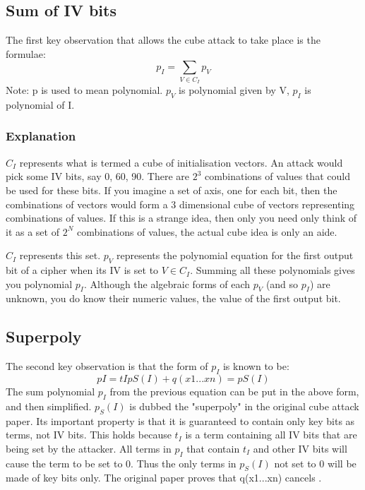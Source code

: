 \documentclass{report}
\begin{document}
\subsection{Sum of IV bits}
The first key observation that allows the cube attack to take place is the formulae:
\begin{equation} \label{eq:superpoly}
p_I = \sum\limits_{V \in C_I} p_V 
\end{equation}
Note: p is used to mean polynomial. $p_V$ is polynomial given by V, $p_I$ is polynomial of I.
\subsubsection{Explanation}
$C_I$ represents what is termed a cube of initialisation vectors. An attack would pick some IV bits, say 0, 60, 90. There are $2^3$ combinations of values that could be used for these bits. If you imagine a set of axis, one for each bit, then the combinations of vectors would form a 3 dimensional cube of vectors representing combinations of values. If this is a strange idea, then only you need only think of it as a set of $2^N$ combinations of values, the actual cube idea is only an aide.

$C_I$ represents this set. $p_V$ represents the polynomial equation for the first output bit of a cipher when its IV is set to $V \in C_I$. Summing all these polynomials gives you polynomial $p_I$. Although the algebraic forms of each $p_V$ (and so $p_I$) are unknown, you do know their numeric values, the value of the first output bit.
\subsection{Superpoly}
The second key observation is that the form of $p_I$ is known to be:
\begin{equation} \label{eq:GFpowers}
pI = tIpS(I)+q(x1...xn)=pS(I)
\end{equation}
The sum polynomial $p_I$ from the previous equation can be put in the above form, and then simplified.
$p_S(I)$ is dubbed the "superpoly" in the original cube attack paper. Its important property is that it is guaranteed to contain only key bits as terms, not IV bits. This holds because $t_I$ is a term containing all IV bits that are being set by the attacker. All terms in $p_I$ that contain $t_I$ and other IV bits will cause the term to be set to 0. Thus the only terms in $p_S(I)$ not set to 0 will be made of key bits only. The original paper proves that q(x1...xn) cancels \cite{DinurShamir2009}.
\end{document}
